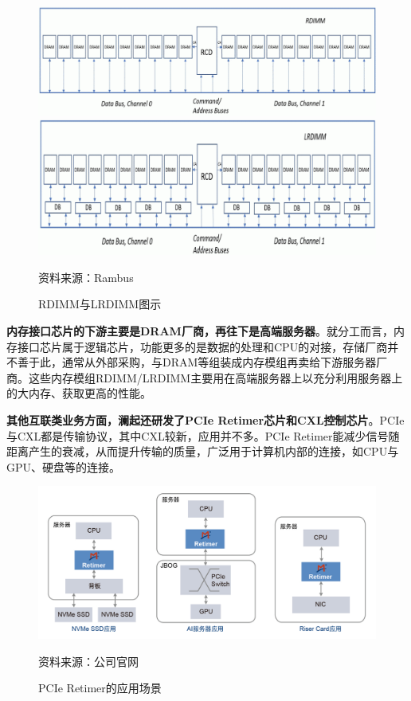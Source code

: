 \documentclass[a4paper,12pt]{ctexart}
\begin{document}
\begin{figure}[H]
    \caption{RDIMM与LRDIMM图示}
    \begin{minipage}{0.48\linewidth}
        \centering
        \includegraphics[width=\linewidth]{img/rdimm.png}
    \end{minipage}
    \begin{minipage}{0.48\linewidth}
        \centering
        \includegraphics[width=\linewidth]{img/lrdimm.png}
    \end{minipage}\par
    \footnotesize{资料来源：Rambus}
\end{figure}

\textbf{内存接口芯片的下游主要是DRAM厂商，再往下是高端服务器}。就分工而言，内存接口芯片属于逻辑芯片，功能更多的是数据的处理和CPU的对接，存储厂商并不善于此，通常从外部采购，与DRAM等组装成内存模组再卖给下游服务器厂商。这些内存模组RDIMM/LRDIMM主要用在高端服务器上以充分利用服务器上的大内存、获取更高的性能。

\textbf{其他互联类业务方面，澜起还研发了PCIe Retimer芯片和CXL控制芯片}。PCIe与CXL都是传输协议，其中CXL较新，应用并不多。PCIe Retimer能减少信号随距离产生的衰减，从而提升传输的质量，广泛用于计算机内部的连接，如CPU与GPU、硬盘等的连接。
\begin{figure}[H]
    {\centering
        \caption{PCIe Retimer的应用场景}
        \includegraphics[width=0.8\linewidth]{img/PCIe 4.0 Retimer Application_CH.jpg}\par}
    \footnotesize{资料来源：公司官网}
\end{figure}
\end{document}
